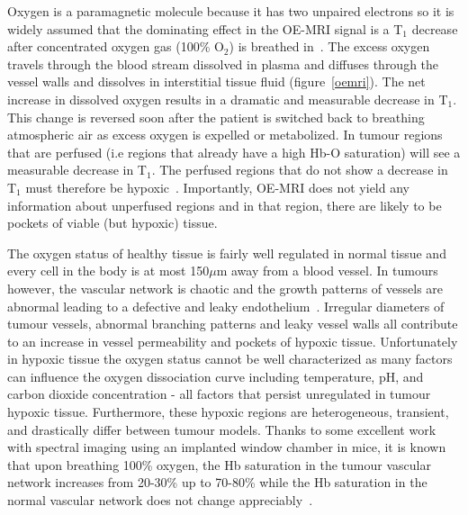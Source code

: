 Oxygen is a paramagnetic molecule because it has two unpaired electrons so it is widely assumed that the dominating effect in the OE-MRI signal is a T$_1$ decrease after concentrated oxygen gas (100\% O$_2$) is breathed in~\cite{OConnor:2016ee,Linnik:2013hf}. 
The excess oxygen travels through the blood stream dissolved in plasma and diffuses through the vessel walls and dissolves in interstitial tissue fluid (figure~\ref{oemri}).
The net increase in dissolved oxygen results in a dramatic and measurable decrease in T$_1$. 
This change is reversed soon after the patient is switched back to breathing atmospheric air as excess oxygen is expelled or metabolized. 
In tumour regions that are perfused (i.e regions that already have a high Hb-O saturation) will see a measurable decrease in T$_1$. 
The perfused regions that do not show a decrease in T$_1$ must therefore be hypoxic~\cite{OConnor:2016ee}. 
Importantly, OE-MRI does not yield any information about unperfused regions and in that region, there are likely to be pockets of viable (but hypoxic) tissue.

The oxygen status of healthy tissue is fairly well regulated in normal tissue and every cell in the body is at most 150$\mu$m away from a blood vessel. 
In tumours however, the vascular network is chaotic and the growth patterns of vessels are abnormal leading to a defective and leaky endothelium~\cite{McDonald:2002ut}. 
Irregular diameters of tumour vessels, abnormal branching patterns and leaky vessel walls all contribute to an increase in vessel permeability and pockets of hypoxic tissue. 
Unfortunately in hypoxic tissue the oxygen status cannot be well characterized as many factors can influence the oxygen dissociation curve including temperature, pH, and carbon dioxide concentration - all factors that persist unregulated in tumour hypoxic tissue. 
Furthermore, these hypoxic regions are heterogeneous, transient, and drastically differ between tumour models. 
Thanks to some excellent work with spectral imaging using an implanted window chamber in mice, it is known that upon breathing 100\% oxygen, the Hb saturation in the tumour vascular network increases from 20-30\% up to 70-80\% while the Hb saturation in the normal vascular network does not change appreciably~\cite{Sorg:2008eg}.

